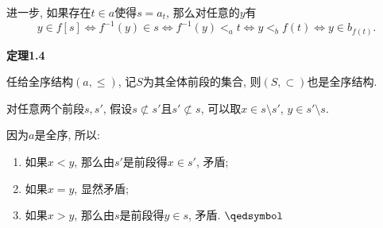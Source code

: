 \documentclass[UTF8]{ctexart}
\begin{document}
进一步, 如果存在$t\in a$使得$s=a_t$, 那么对任意的$y$有
\begin{equation*}
    y\in f[s]\iff f^{-1}(y)\in s\iff f^{-1}(y)<_at
    \iff y<_bf(t)\iff y\in b_{f(t)}.
\tag*{\qedsymbol}\end{equation*}


\vspace{10pt}

\hypertarget{sec:定理1.4}{}
\noindent\textbf{定理1.4}

任给全序结构$(a,\leqslant)$, 记$S$为其全体前段的集合, 则$(S,\subset)$也是全序结构.


对任意两个前段$s,s'$, 假设$s\not\subset s'$且$s'\not\subset s$,
可以取$x\in s\setminus s'$, $y\in s'\setminus s$.

因为$a$是全序, 所以:
\begin{enumerate}
    \item 如果$x<y$, 那么由$s'$是前段得$x\in s'$, 矛盾;
    \item 如果$x=y$, 显然矛盾;
    \item 如果$x>y$, 那么由$s$是前段得$y\in s$, 矛盾. \hfill $\qedsymbol$
\end{enumerate}
\end{document}
